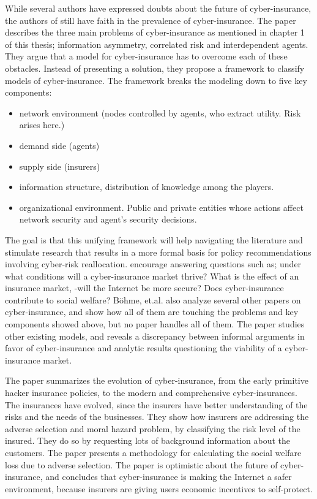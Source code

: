 

While several authors have expressed doubts about the future of cyber-insurance, the authors of \cite{bohme2010modeling} still have faith in the prevalence of cyber-insurance. The paper describes the three main problems of cyber-insurance as mentioned in chapter 1 of this thesis; information asymmetry, correlated risk and interdependent agents. They argue that a model for cyber-insurance has to overcome each of these obstacles. Instead of presenting a solution, they propose a framework to classify models of cyber-insurance. 
The framework breaks the modeling down to five key components: 
\begin{itemize}
 \item network environment (nodes controlled by agents, who extract utility. Risk arises here.)
 \item demand side (agents) 
 \item supply side (insurers) 
 \item information structure, distribution of knowledge among the players. 
 \item organizational environment. Public and private entities whose actions affect network security and agent's security decisions.
 
\end{itemize}


The goal is that this unifying framework will help navigating the literature and stimulate research that results in a more formal basis for policy recommendations involving cyber-risk reallocation. \cite{bohme2010modeling} encourage answering questions such as; under what conditions will a cyber-insurance market thrive? What is the effect of an insurance market, -will the Internet be more secure? Does cyber-insurance contribute to social welfare?
Böhme, et.al. also analyze several other papers on cyber-insurance, and show how all of them are touching the problems and key components showed above, but no paper handles all of them.
The paper studies other existing models, and reveals a discrepancy between informal arguments in favor of cyber-insurance and analytic results questioning the viability of a cyber-insurance market. 

The paper \cite{majuca2006evolution} summarizes the evolution of cyber-insurance, from the early primitive hacker insurance policies, to the modern and comprehensive cyber-insurances. The insurances have evolved, since the insurers have better understanding of the risks and the needs of the businesses. They show how insurers are addressing the adverse selection and moral hazard problem, by classifying the risk level of the insured. They do so by requesting lots of background information about the customers. The paper presents a methodology for calculating the social welfare loss due to adverse selection. The paper is optimistic about the future of cyber-insurance, and concludes that cyber-insurance is making the Internet a safer environment, because insurers are giving users economic incentives to self-protect. 

